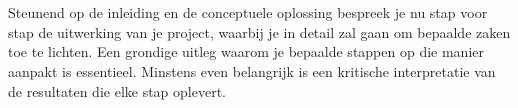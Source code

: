 



\chapter{}%
\label{ch:praktische-uitwerking}

Steunend op de inleiding en de conceptuele oplossing bespreek je nu stap voor stap de uitwerking van je
project, waarbij je in detail zal gaan om bepaalde zaken toe te lichten. Een grondige uitleg waarom je
bepaalde stappen op die manier aanpakt is essentieel. Minstens even belangrijk is een kritische interpretatie
van de resultaten die elke stap oplevert.

